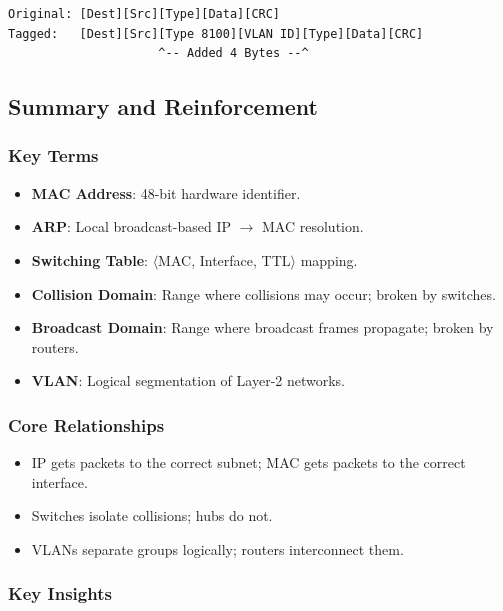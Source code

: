 \documentclass[12pt]{article}
\begin{document}
\begin{verbatim}
Original: [Dest][Src][Type][Data][CRC]
Tagged:   [Dest][Src][Type 8100][VLAN ID][Type][Data][CRC]
                     ^-- Added 4 Bytes --^
\end{verbatim}

\subsection{Summary and Reinforcement}

\subsubsection{Key Terms}

\begin{itemize}
    \item \textbf{MAC Address}: 48-bit hardware identifier.
    \item \textbf{ARP}: Local broadcast-based IP $\rightarrow$ MAC resolution.
    \item \textbf{Switching Table}: $\langle$MAC, Interface, TTL$\rangle$ mapping.
    \item \textbf{Collision Domain}: Range where collisions may occur; broken by switches.
    \item \textbf{Broadcast Domain}: Range where broadcast frames propagate; broken by routers.
    \item \textbf{VLAN}: Logical segmentation of Layer-2 networks.
\end{itemize}

\subsubsection{Core Relationships}

\begin{itemize}
    \item IP gets packets to the correct subnet; MAC gets packets to the correct interface.
    \item Switches isolate collisions; hubs do not.
    \item VLANs separate groups logically; routers interconnect them.
\end{itemize}

\subsubsection{Key Insights}
\end{document}
